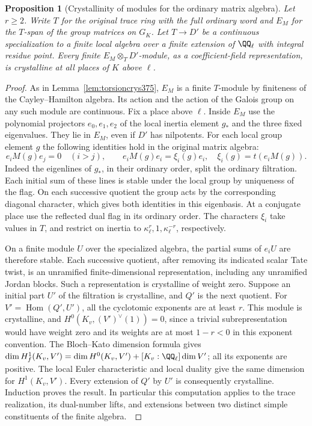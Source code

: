 \documentclass[a4paper,11pt]{article}
\newtheorem{proposition}{Proposition}[section]
\theoremstyle{definition}
\theoremstyle{remark}
\numberwithin{equation}{section}
\begin{document}
\begin{proposition}[Crystallinity of modules for the ordinary matrix algebra]\leavevmode
\label{prop:filteredalgebra427}
Let \(r\ge2\). Write \(T\) for the original trace ring with
the full ordinary word and \(E_M\) for the \(T\)-span of the
group matrices on \(G_K\). Let \(T\to D'\) be a continuous
specialization to a finite local algebra over a finite extension
of \(\QQ_\ell\) with integral residue point. Every finite
\(E_M\otimes_T D'\)-module, as a coefficient-field representation,
is crystalline at all places of \(K\) above \(\ell\).
\end{proposition}
\begin{proof}
As in Lemma~\ref{lem:torsioncrys375}, \(E_M\) is a finite
\(T\)-module by finiteness of the Cayley--Hamilton algebra.
Its action and the action of the Galois group on any such
module are continuous. Fix a place above \(\ell\). Inside
\(E_M\) use the polynomial projectors \(e_0,e_1,e_2\) of
the local inertia element \(g_*\) and the three fixed
eigenvalues. They lie in \(E_M\), even if \(D'\) has
nilpotents. For each local group element \(g\) the following
identities hold in the original matrix algebra:
\[
  e_iM(g)e_j=0\quad(i>j),\qquad
  e_iM(g)e_i=\xi_i(g)e_i,\quad
  \xi_i(g)=t(e_iM(g)).
\]
Indeed the eigenlines of \(g_*\), in their ordinary order,
split the ordinary filtration. Each initial sum of these
lines is stable under the local group by uniqueness of the
flag. On each successive quotient the group acts by the
corresponding diagonal character, which gives both identities
in this eigenbasis. At a conjugate place use the reflected
dual flag in its ordinary order. The characters \(\xi_i\)
take values in \(T\), and restrict on inertia to
\(\kappa_\ell^{r},1,\kappa_\ell^{-r}\), respectively.

On a finite module \(U\) over the specialized algebra, the
partial sums of \(e_iU\) are therefore stable. Each successive
quotient, after removing its indicated scalar Tate twist,
is an unramified finite-dimensional representation, including
any unramified Jordan blocks. Such a representation is
crystalline of weight zero. Suppose an initial part \(U'\)
of the filtration is crystalline, and \(Q'\) is the next
quotient. For \(V'=\operatorname{Hom}(Q',U')\), all the
cyclotomic exponents are at least \(r\). This module is
crystalline, and \(H^0(K_v,(V')^\vee(1))=0\), since a
trivial subrepresentation would have weight zero and its
weights are at most \(1-r<0\) in this exponent convention.
The Bloch--Kato dimension formula gives
\(\dim H^1_f(K_v,V')=\dim H^0(K_v,V')+[K_v:\QQ_\ell]\dim V'\);
all its exponents are positive. The local Euler characteristic
and local duality give the same dimension for \(H^1(K_v,V')\).
Every extension of \(Q'\) by \(U'\) is consequently crystalline.
Induction proves the result. In particular this computation
applies to the trace realization, its dual-number lifts, and
extensions between two distinct simple constituents of the
finite algebra.~\cite{XI-VIII-VI-bk117}
\end{proof}
\end{document}
